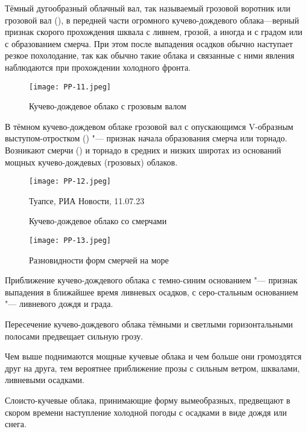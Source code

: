  Тёмный дугообразный облачный вал, так называемый грозовой
воротник или грозовой вал (), в передней части огромного
кучево-дождевого облака—верный признак скорого прохождения шквала с
ливнем, грозой, а иногда и с градом или с образованием смерча. При этом
после выпадения осадков обычно наступает резкое похолодание, так как
обычно такие облака и связанные с ними явления наблюдаются при
прохождении холодного фронта.

\begin{figure}[htb]
  \centering{}
  \texttt{[image: PP-11.jpeg]}
  \caption{Кучево-дождевое облако с грозовым валом}
  \label{fig:pp11}
  \small
  \centering{}
\end{figure}

 В тёмном кучево-дождевом облаке грозовой вал с опускающимся
V-образным выступом-отростком () "--- признак начала образования
смерча или торнадо. Возникают смерчи () и торнадо в средних и
низких широтах из оснований мощных кучево-дождевых (грозовых) облаков.

\begin{figure}[htb]
  \centering{}
  \texttt{[image: PP-12.jpeg]}
  \caption{Кучево-дождевое облако со смерчами}
  \label{fig:pp12}
  \small
  \centering{}Туапсе, РИА Новости, 11.07.23
\end{figure}

\begin{figure}[htb]
  \centering{}
  \texttt{[image: PP-13.jpeg]}
  \caption{Разновидности форм смерчей на море}
  \label{fig:pp13}
  \small
  \centering{}
\end{figure}

 Приближение кучево-дождевого облака с темно-синим основанием "---
признак выпадения в ближайшее время ливневых осадков, с серо-стальным
основанием "--- ливневого дождя и града.

 Пересечение кучево-дождевого облака тёмными и светлыми
горизонтальными полосами предвещает сильную грозу.

 Чем выше поднимаются мощные кучевые облака и чем больше они
громоздятся друг на друга, тем вероятнее приближение прозы с сильным
ветром, шквалами, ливневыми осадками.

 Слоисто-кучевые облака, принимающие форму вымеобразных,
предвещают в скором времени наступление холодной погоды с осадками в
виде дождя или снега.

